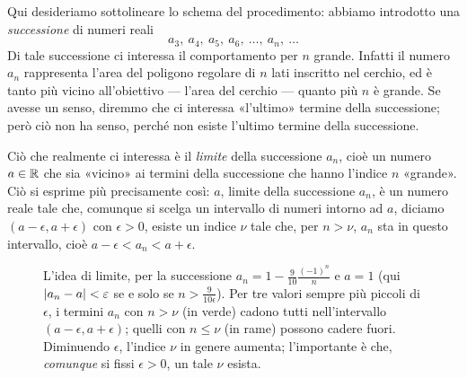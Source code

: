 Qui desideriamo sottolineare lo schema del procedimento: abbiamo introdotto una
\emph{successione} di numeri reali
\begin{equation}\label{eq:succ-aree}
  a_{3},\ a_{4},\ a_{5},\ a_{6},\ \dots,\ a_{n},\ \dots
\end{equation}
Di tale successione ci interessa il comportamento per $n$ grande. Infatti il numero
$a_{n}$ rappresenta l'area del poligono regolare di $n$ lati inscritto nel cerchio, ed
è tanto più vicino all'obiettivo --- l'area del cerchio --- quanto più $n$ è grande. Se
avesse un senso, diremmo che ci interessa «l'ultimo» termine della successione; però ciò
non ha senso, perché non esiste l'ultimo termine della successione.

Ciò che realmente ci interessa è il \emph{limite} della successione $a_{n}$, cioè un
numero $a\in\mathbb{R}$ che sia «vicino» ai termini della successione che hanno l'indice $n$
«grande». Ciò si esprime più precisamente così: $a$, limite della successione $a_{n}$,
è un numero reale tale che, comunque si scelga un intervallo di numeri intorno ad $a$,
diciamo $(a-\epsilon,a+\epsilon)$ con $\epsilon>0$, esiste un indice $\nu$ tale che, per
$n>\nu$, $a_{n}$ sta in questo intervallo, cioè $a-\epsilon<a_{n}<a+\epsilon$.

\begin{figure}[htb]
\centering
{}
\caption{L'idea di limite, per la successione $a_{n}=1-\frac{9}{10}\frac{(-1)^{n}}{n}$ e $a=1$
(qui $\lvert a_{n}-a\rvert<\varepsilon$ se e solo se $n>\frac{9}{10\epsilon}$). Per tre valori sempre
più piccoli di $\epsilon$, i termini
$a_{n}$ con $n>\nu$ (in verde) cadono tutti nell'intervallo $(a-\epsilon,a+\epsilon)$;
quelli con $n\le\nu$ (in rame) possono cadere fuori. Diminuendo $\epsilon$, l'indice
$\nu$ in genere aumenta; l'importante è che, \emph{comunque} si fissi $\epsilon>0$, un
tale $\nu$ esista.}
\label{fig:idea-limite}
\end{figure}

